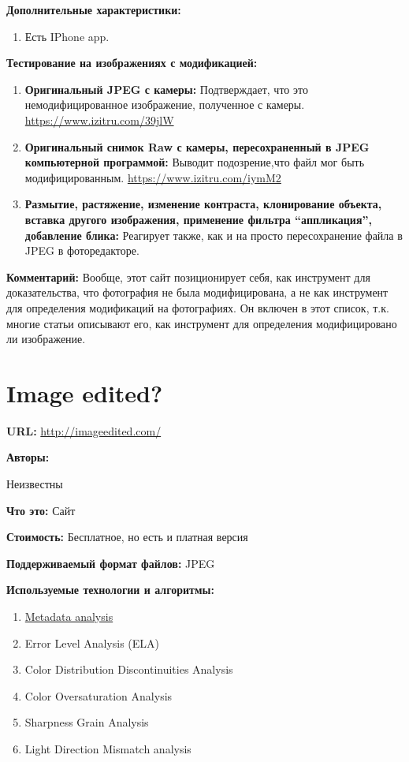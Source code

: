 \textbf{Дополнительные характеристики:}
\begin{enumerate}
  \item	Есть IPhone app.
\end{enumerate}

\textbf{Тестирование на изображениях с модификацией:}
\begin{enumerate}
\item \textbf{Оригинальный JPEG с камеры:}
Подтверждает, что это немодифицированное изображение, полученное с камеры.
\url{https://www.izitru.com/39jlW}
\item \textbf{Оригинальный снимок Raw с камеры, пересохраненный в JPEG компьютерной программой:}
Выводит подозрение,что файл мог быть модифицированным.
\url{https://www.izitru.com/iymM2}
\item \textbf{Размытие, растяжение, изменение контраста, клонирование объекта, вставка другого изображения, применение фильтра “аппликация”, добавление блика:}
Реагирует также, как и на просто пересохранение файла в JPEG в фоторедакторе.
\end{enumerate}


\textbf{Комментарий:}
Вообще, этот сайт позиционирует себя, как инструмент для доказательства, что фотография не была модифицирована, а не как инструмент для определения модификаций на фотографиях. Он включен в этот список, т.к. многие статьи описывают его, как инструмент для определения модифицировано ли изображение.


\newpage

\section{Image edited?}

\textbf{URL: } \url{http://imageedited.com/}

\textbf{Авторы:}

 Неизвестны

\textbf{Что это:} Сайт

\textbf{Стоимость:} Бесплатное, но есть и платная версия

\textbf{Поддерживаемый формат файлов:} JPEG

\textbf{Используемые технологии и алгоритмы:}

\begin{enumerate}
  \item \href{http://fotoforensics.com/tutorial-meta.php}{Metadata analysis}
  \item Error Level Analysis (ELA)
  
  \item Color Distribution Discontinuities Analysis
  
  \item Color Oversaturation Analysis
  
  \item Sharpness Grain Analysis
  
  \item Light Direction Mismatch analysis
\end{enumerate} 

